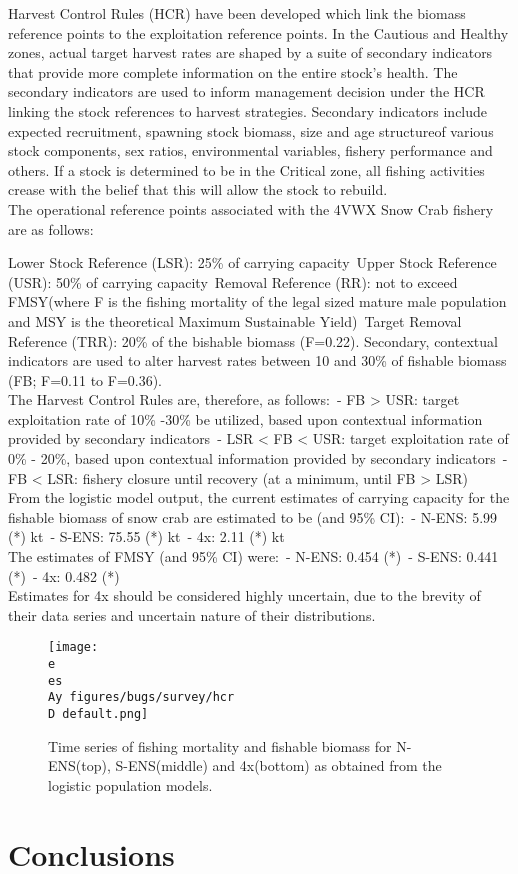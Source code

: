 \documentclass[paper=a4, fontsize=11pt]{article}
\newcommand{\D}{.}
\newcommand{\e}{/home/michelle/ecomod_data/}
\newcommand{\es}{snowcrab/}
\newcommand{\Ay}{assessments/2015/}
\begin{document}
Harvest Control Rules (HCR) have been developed which link the biomass reference points to the exploitation reference points. In the Cautious and Healthy zones, actual target harvest rates are shaped by a suite of secondary indicators that provide more complete information on the entire stock's health. The secondary indicators are used to inform management decision under the HCR linking the stock references to harvest strategies. Secondary indicators include expected recruitment, spawning stock biomass, size and age structureof various stock components, sex ratios, environmental variables, fishery performance and others. If a stock is determined to be in the Critical zone, all fishing activities crease with the belief that this will allow the stock to rebuild. \\

The operational reference points associated with the 4VWX Snow Crab fishery are as follows: \

Lower Stock Reference (LSR): 25\% of carrying capacity\
Upper Stock Reference (USR): 50\% of carrying capacity\
Removal Reference (RR): not to exceed FMSY(where F is the fishing mortality of the legal sized mature male population and MSY is the theoretical Maximum Sustainable Yield)\
Target Removal Reference (TRR): 20\% of the bishable biomass (F=0.22). Secondary, contextual indicators are used to alter harvest rates between 10 and 30\% of fishable biomass (FB; F=0.11 to F=0.36).\\

The Harvest Control Rules are, therefore, as follows:\
- FB > USR: target exploitation rate of 10\% -30\% be utilized, based upon contextual information provided by secondary indicators\
- LSR < FB < USR: target exploitation rate of 0\% - 20\%, based upon contextual information provided by secondary indicators\
- FB < LSR: fishery closure until recovery (at a minimum, until FB > LSR)\\

From the logistic model output, the current estimates of carrying capacity for the fishable biomass of snow crab are estimated to be (and 95\% CI):\
- N-ENS: 5.99 (*) kt\
- S-ENS: 75.55 (*) kt\
- 4x: 2.11 (*) kt\\

The estimates of FMSY (and 95\% CI) were:\
- N-ENS: 0.454 (*)\
- S-ENS: 0.441 (*)\
- 4x: 0.482 (*)\\

Estimates for 4x should be considered highly uncertain, due to the brevity of their data series and uncertain nature of their distributions. 

\begin{figure}[h]
  \centering
     \texttt{[image: \\e \\es \\Ay figures/bugs/survey/hcr\\D default.png]}
    \caption{Time series of fishing mortality and fishable biomass for N-ENS(top), S-ENS(middle) and 4x(bottom) as obtained from the logistic population models.}
\end{figure}

\section{Conclusions}
\end{document}
